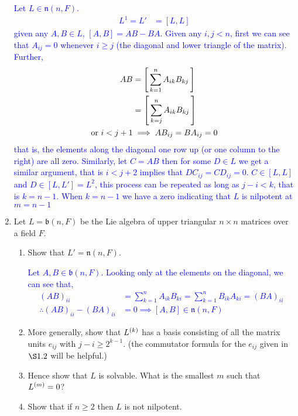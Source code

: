 \documentclass[12pt,a4paper]{report}
\newcommand{\BLUE}[1]{\textcolor{blue}{#1}}
\begin{document}
\begin{enumerate}[label=4.\arabic*]
\BLUE{Let $L \in \mathfrak{n}(n,F)$.\begin{align*}
	L^1 = L' &= [L,L]
\end{align*}given any $A,B \in L$, $[A,B] = AB-BA$.  Given any $i,j < n$, first we can see that $A_{ij}=0$ whenever $i\ge j$ (the diagonal and lower triangle of the matrix).  Further, 
\begin{align*}
	AB &= \left [\,  \sum_{k=1}^n A_{ik}B_{kj}  \,\right ] \\
	&= \left [\, \sum_{k=j}^n A_{ik}B_{kj} \,\right ] \\
	\text{or } i<j+1 &\implies AB_{ij} = BA_{ij} = 0 
\end{align*}that is, the elements along the diagonal one row up (or one column to the right) are all zero.  Similarly, let $C=AB$ then for some $D \in L$ we get a similar argument, that is $i<j+2$ implies that $DC_{ij}=CD_{ij}=0$.  $C \in [L,L]$ and $D\in [L, L']=L^2$, this process can be repeated as long as $j-i<k$, that is $k=n-1$.  When $k=n-1$ we have a zero indicating that $L$ is nilpotent at $m=n-1$
}
\item Let $L=\mathfrak{b}(n,F)$ be the Lie algebra of upper triangular $n\times n$ matrices over a field $F$.
\begin{enumerate}[label=(\roman*)]

	\item Show that $L'=\mathfrak{n}(n,F)$.
	
	\BLUE{Let $A,B \in \mathfrak{b}(n,F)$.  Looking only at the elements on the diagonal, we can see that, 
	\begin{align*}
		(AB)_{ii} &= \sum_{k=1}^n A_{ik}B_{ki} = \sum_{k=1}^n B_{ik}A_{ki} = (BA)_{ii} \\
		\therefore (AB)_{ii}-(BA)_{ii} &= 0 \implies [A,B] \in \mathfrak{n}(n, F)
	\end{align*}
	}
	
	\item More generally, show that $L^{(k)}$ has a basis consisting of all the matrix units $e_{ij}$ with $j-i\ge 2^{k-1}$.  (the commutator formula for the $e_{ij}$ given in $\S1.2$ will be helpful.)
	
	\item Hence show that $L$ is solvable.  What is the smallest $m$ such that $L^{(m)}=0$?
	
	\item Show that if $n\ge 2$ then $L$ is not nilpotent.

\end{enumerate}


\end{enumerate}
\end{document}
